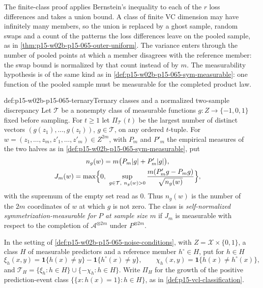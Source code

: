 The finite-class proof applies Bernstein's inequality to each of the \(r\)
loss differences and takes a union bound. A class of finite VC dimension
may have infinitely many members, so the union is replaced by a ghost
sample, random swaps and a count of the patterns the loss differences leave
on the pooled sample, as in \cref{thm:p15-w02b-p15-065-outer-uniform}. The
variance enters through the number of pooled points at which a member
disagrees with the reference member: the swap bound is normalized by that
count instead of by \(m\). The measurability hypothesis is of the same kind
as in \cref{def:p15-w02b-p15-065-sym-measurable}: one function of the
pooled sample must be measurable for the completed product law.

\begin{hbdefinition}{def:p15-w02b-p15-065-ternary}{Ternary classes and a normalized two-sample discrepancy}
Let \(\mathcal T\) be a nonempty class of measurable functions
\(g:Z\to\{-1,0,1\}\) fixed before sampling. For \(t\geq1\) let
\(\Pi_{\mathcal T}(t)\) be the largest number of distinct vectors
\((g(z_1),\ldots,g(z_t))\), \(g\in\mathcal T\), on any ordered \(t\)-tuple.
For \(w=(z_1,\ldots,z_m,z'_1,\ldots,z'_m)\in Z^{2m}\), with \(P_m\) and
\(P'_m\) the empirical measures of the two halves as in
\cref{def:p15-w02b-p15-065-sym-measurable}, put
\begin{gather*}
 n_g(w)=m\bigl(P_m|g|+P'_m|g|\bigr),\\
 J_m(w)=\max\Bigl\{0,\ \sup_{g\in\mathcal T,\ n_g(w)>0}
 \frac{m(P'_mg-P_mg)}{\sqrt{n_g(w)}}\Bigr\},
\end{gather*}
with the supremum of the empty set read as \(0\). Thus \(n_g(w)\) is the
number of the \(2m\) coordinates of \(w\) at which \(g\) is not zero. The
class is \emph{self-normalized symmetrization-\allowbreak measurable for
\(P\) at sample size \(m\)} if \(J_m\) is measurable with respect to the
completion of \(\mathcal A^{\otimes2m}\) under \(P^{\otimes2m}\).

In the setting of \cref{def:p15-w02b-p15-065-noise-conditions}, with
\(Z=\mathcal X\times\{0,1\}\), a class \(H\) of measurable predictors and
a reference member \(h^{\circ}\in H\), put for \(h\in H\)
\[
 \xi_h(x,y)=\mathbf1\{h(x)\ne y\}-\mathbf1\{h^{\circ}(x)\ne y\},\qquad
 \chi_h(x,y)=\mathbf1\{h(x)\ne h^{\circ}(x)\},
\]
and \(\mathcal T_H=\{\xi_h:h\in H\}\cup\{-\chi_h:h\in H\}\). Write
\(\Pi_H\) for the growth of the positive prediction-event class
\(\{\{x:h(x)=1\}:h\in H\}\), as in \cref{def:p15-vcl-classification}.
\end{hbdefinition}

